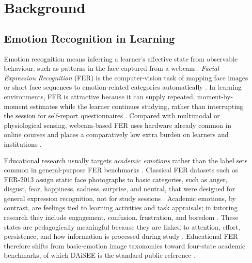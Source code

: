 \chapter{Background}\label{chap:background-foundations}

\section{Emotion Recognition in Learning}

Emotion recognition means inferring a learner's affective state from observable behaviour, such as patterns in the face captured from a webcam \cite{lek_academic_2023,florestiyanto_emotion_2024}. \emph{Facial Expression Recognition} (FER) is the computer-vision task of mapping face images or short face sequences to emotion-related categories automatically \cite{lek_academic_2023}. In learning environments, FER is attractive because it can supply repeated, moment-by-moment estimates while the learner continues studying, rather than interrupting the session for self-report questionnaires \cite{vistorte_integrating_2024}. Compared with multimodal or physiological sensing, webcam-based FER uses hardware already common in online courses and places a comparatively low extra burden on learners and institutions \cite{vistorte_integrating_2024,florestiyanto_emotion_2024,lek_academic_2023}.

Educational research usually targets \emph{academic emotions} rather than the label sets common in general-purpose FER benchmarks \cite{pekrun_control-value_2006,dmello_language_2012,lek_academic_2023}. Classical FER datasets such as FER-2013 assign static face photographs to basic categories, such as anger, disgust, fear, happiness, sadness, surprise, and neutral, that were designed for general expression recognition, not for study sessions \cite{lek_academic_2023}. Academic emotions, by contrast, are feelings tied to learning activities and task appraisals; in tutoring research they include engagement, confusion, frustration, and boredom \cite{dmello_language_2012,pekrun_control-value_2006}. These states are pedagogically meaningful because they are linked to attention, effort, persistence, and how information is processed during study \cite{pekrun_control-value_2006,tyng_influences_2017}. Educational FER therefore shifts from basic-emotion image taxonomies toward four-state academic benchmarks, of which DAiSEE is the standard public reference \cite{gupta_daisee_2016,lek_academic_2023,florestiyanto_emotion_2024}.

